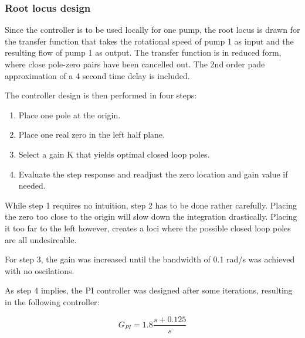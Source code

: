\subsubsection{Root locus design}
Since the controller is to be used locally for one pump, the root locus is drawn for the transfer function that takes the rotational speed of pump 1 as input and the resulting flow of pump 1 as output. The transfer function is in reduced form, where close pole-zero pairs have been cancelled out. The 2nd order pade approximation of a 4 second time delay is included.


The controller design is then performed in four steps:
\begin{enumerate}
	\item Place one pole at the origin.
	\item Place one real zero in the left half plane.
	\item Select a gain K that yields optimal closed loop poles.
	\item Evaluate the step response and readjust the zero location and gain value if needed.
\end{enumerate}

While step 1 requires no intuition, step 2 has to be done rather carefully. Placing the zero too close to the origin will slow down the integration drastically. Placing it too far to the left however, creates a loci where the possible closed loop poles are all undesireable.

For step 3, the gain was increased until the bandwidth of 0.1 rad/s was achieved with no oscilations. 

As step 4 implies, the PI controller was designed after some iterations, resulting in the following controller:

 \begin{equation}\label{eq:PITransferFunction}
	G_{PI} = 1.8 \frac{s+0.125}{s}
\end{equation}

